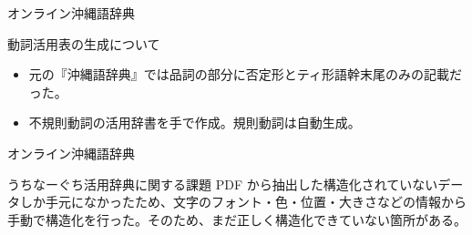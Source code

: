 \documentclass[14pt]{beamer}
\begin{document}
\begin{frame}{オンライン沖縄語辞典}
  \begin{block}{動詞活用表の生成について}
    \begin{itemize}
    \item 元の『沖縄語辞典』では品詞の部分に否定形とティ形語幹末尾のみの記載だった。
    \item 不規則動詞の活用辞書を手で作成。規則動詞は自動生成。
    \end{itemize}
  \end{block}
\end{frame}


\begin{frame}{オンライン沖縄語辞典}
  \begin{block}{うちなーぐち活用辞典に関する課題}
    \vspace{0pt}    
    PDF から抽出した構造化されていないデータしか手元になかったため、文字のフォント・色・位置・大きさなどの情報から手動で構造化を行った。そのため、まだ正しく構造化できていない箇所がある。
  \end{block}
\end{frame}
\end{document}
